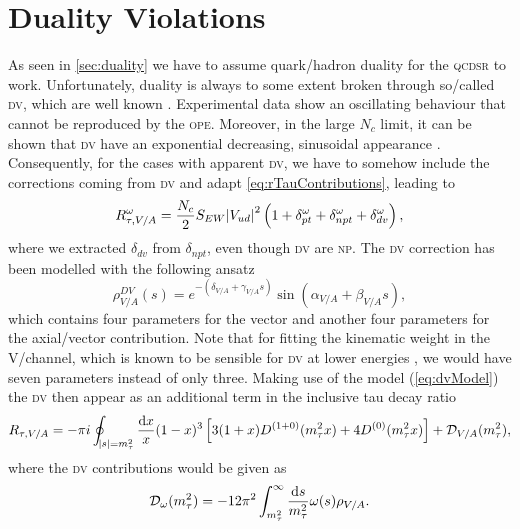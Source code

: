 \documentclass[../../index.tex]{subfiles}
\begin{document}
\section{Duality Violations}
As seen in \cref{sec:duality} we have to assume quark\-/hadron duality for the
\textsc{qcdsr} to work. Unfortunately, duality is always to some extent broken
through so\-/called \textsc{dv}, which are well known
\cite{Cata2008,Cata2009}. Experimental data show an oscillating behaviour that
cannot be reproduced by the \textsc{ope}. Moreover, in the large \(N_c\) limit, it
can be shown that \textsc{dv} have an exponential decreasing, sinusoidal
appearance \cite{Cata2005}. Consequently, for the cases with apparent \textsc{dv},
we have to somehow include the corrections coming from \textsc{dv} and adapt
\cref{eq:rTauContributions}, leading to
\begin{equation}
  R_{\tau,V/A}^\omega = \frac{N_c}{2}S_{EW} \abs{V_{ud}}^2 \left( 1 + \delta_{pt}^{\omega} + \delta_{npt}^{\omega} + \delta_{dv}^{\omega} \right),
\end{equation}
where we extracted \(\delta_{dv}\) from \(\delta_{npt}\), even though
\textsc{dv} are \textsc{np}. The \textsc{dv} correction has been modelled with
the following ansatz \cite{Cata2009}
\begin{equation}
  \label{eq:dvModel}
  \rho_{V/A}^{DV}(s) = e^{-(\delta_{V/A}+\gamma_{V/A}s)} \sin(\alpha_{V/A} + \beta_{V/A}s),
\end{equation}
which contains four parameters for the vector and another four parameters for
the axial\-/vector contribution. Note that for fitting the kinematic weight in
the \textsc{V}\-/channel, which is known to be sensible for \textsc{dv} at lower
energies \cite{Boito2011a}, we would have seven parameters instead of only
three. Making use of the model (\cref{eq:dvModel}) the \textsc{dv} then appear
as an additional term in the inclusive tau decay ratio
\begin{equation}
  R_{\tau,V/A} = - \pi i \oint_{\abs{s}=m_\tau^2} \frac{\dif x}{x} (1 - x)^3 \left[ 3
    (1 + x) D^{(1+0)}(m_\tau^2 x) + 4 D^{(0)}(m_\tau^2 x) \right] +  \mathcal{D}_{V/A}(m_\tau^2),
\end{equation}
where the \textsc{dv} contributions would be given as
\begin{equation}
  \mathcal{D}_\omega(m_\tau^2) = -12 \pi^2 \int_{m_\tau^2}^\infty \frac{\dif s}{m_\tau^2} \omega(s) \rho_{V/A}.
\end{equation}
\end{document}
